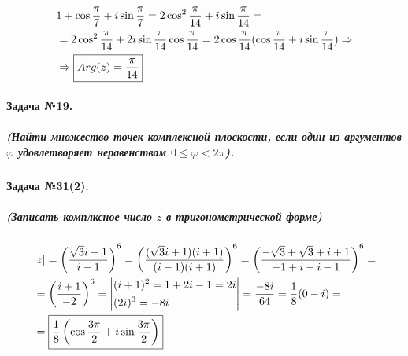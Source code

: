 \documentclass[a4paper,12pt]{report}
\begin{document}
\begin{align*}
	&1+\cos\dfrac{\pi}{7}+i\sin\dfrac{\pi}{7}=
	2\cos^2\dfrac{\pi}{14}+i\sin\dfrac{\pi}{14}=\\
	&=2\cos^2\dfrac{\pi}{14}+2i\sin\dfrac{\pi}{14}\cos\dfrac{\pi}{14}=
	2\cos\dfrac{\pi}{14}(\cos\dfrac{\pi}{14}+i\sin\dfrac{\pi}{14})
	\Rightarrow\\ 
	&\Rightarrow \fbox{$ Arg(z)=\dfrac{\pi}{14} $}
\end{align*}

\paragraph{Задача №19.}
\subparagraph{(Найти множество точек комплексной плоскости,
если один из аргументов $ \varphi $ удовлетворяет 
неравенствам $ 0\le\varphi<2\pi $).}

\paragraph{Задача №31(2).}
\subparagraph{(Записать комплксное число $ z $ в тригонометрической форме)}

\begin{align*}
	&|z|=\left(\dfrac{\sqrt{3}i+1}{i-1}\right)^6=
	\left(\dfrac{(\sqrt{3}i+1)(i+1)}{(i-1)(i+1)}\right)^6=
	\left(\dfrac{-\sqrt{3}+\sqrt{3}+i+1}{-1+i-i-1}\right)^6=\\
	&=\left(\dfrac{i+1}{-2}\right)^6=
	\left|
		\begin{aligned}
			&(i+1)^2=1+2i-1=2i\\
			&(2i)^3=-8i
		\end{aligned}
	\right|=
	\dfrac{-8i}{64}=\dfrac{1}{8}(0-i)=\\
	&=\fbox{$ \dfrac{1}{8}\left(\cos\dfrac{3\pi}{2}+i\sin\dfrac{3\pi}{2}\right) $}
\end{align*}
\end{document}
